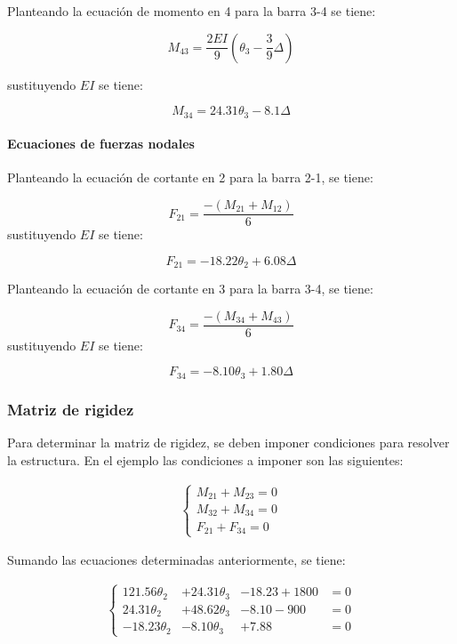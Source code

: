 Planteando la ecuación de momento en 4 para la barra 3-4 se tiene:

$$
M_{43} = \frac{2EI}{9} \left(\theta_3 - \frac{3}{9} \Delta \right)
$$

sustituyendo $EI$ se tiene:

\begin{equation}
\boxed{
	M_{34} = 24.31 \theta_3 - 8.1 \Delta
}
\end{equation}

\paragraph{Ecuaciones de fuerzas nodales}


Planteando la ecuación de cortante en 2 para la barra 2-1, se tiene:

$$
F_{21} = \frac{-(M_{21}+M_{12})}{6}
$$
sustituyendo $EI$ se tiene:

\begin{equation}
\boxed{
	F_{21} = -18.22 \theta_2 + 6.08 \Delta
}
\end{equation}

Planteando la ecuación de cortante en 3 para la barra 3-4, se tiene:

$$
F_{34} = \frac{-(M_{34}+M_{43})}{6}
$$
sustituyendo $EI$ se tiene:

\begin{equation}
\boxed{
	F_{34} = -8.10 \theta_3 + 1.80 \Delta
}
\end{equation}

\subsubsection{Matriz de rigidez}

Para determinar la matriz de rigidez, se deben imponer condiciones para resolver la estructura. En el ejemplo las condiciones a imponer son las siguientes:


\begin{eqnarray}
	\left\lbrace 
	\begin{array}{l}
	M_{21}+M_{23} = 0 \\
	M_{32}+M_{34} = 0 \\
	F_{21}+F_{34} = 0
	\end{array}
	\right.
\end{eqnarray}

Sumando las ecuaciones determinadas anteriormente, se tiene:

\begin{eqnarray}
	\left\lbrace 
	\begin{array}{llll}
	121.56 \theta_{2} &+ 24.31 \theta_{3} &-18.23 +1800 &= 0\\
	24.31 \theta_{2} &+ 48.62 \theta_{3} &-8.10 -900  &= 0\\
	-18.23 \theta_{2} &-8.10 \theta_{3} &+7.88 &= 0
	\end{array}
	\right.
\end{eqnarray}

